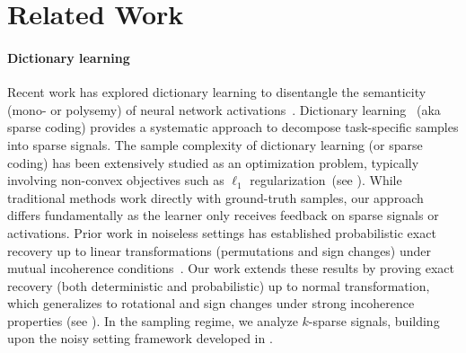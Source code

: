 \section{Related Work}
\paragraph{Dictionary learning}
Recent work has explored dictionary learning to disentangle the semanticity (mono- or polysemy) of neural network activations~\citep{faruqui2015sparse,arora2018linear,subramanian2018spine,zhang2019word,yun2021transformer}. Dictionary learning~\citep{mallat_dict, OLSHAUSEN19973311} (aka sparse coding) provides a systematic approach to decompose task-specific samples into sparse signals. The sample complexity of dictionary learning (or sparse coding) has been extensively studied as an optimization problem, typically involving non-convex objectives such as $\ell_1$ regularization~(see \cite{bachsparse}). While traditional methods work directly with ground-truth samples, our approach differs fundamentally as the learner only receives feedback on sparse signals or activations. Prior work in noiseless settings has established probabilistic exact recovery up to linear transformations (permutations and sign changes) under mutual incoherence conditions~\citep{gribonval_rotation, agarwal_incoherent}. Our work extends these results by proving exact recovery (both deterministic and probabilistic) up to normal transformation, which generalizes to rotational and sign changes under strong incoherence properties (see ). In the sampling regime, we analyze $k$-sparse signals, building upon the noisy setting framework developed in \citet{Arora2013NewAF,bachsparse}. 

